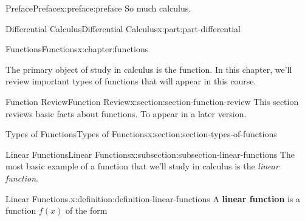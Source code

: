 \documentclass[twoside,10pt,]{book}
\newcommand{\terminology}[1]{\textbf{#1}}
\numberwithin{equation}{part}
\begin{document}
\typeout{************************************************}
%
\begin{preface}{Preface}{}{Preface}{}{}{x:preface:preface}
So much calculus.%
\end{preface}
\setcounter{tocdepth}{1}
\renewcommand*\contentsname{Contents}
\tableofcontents
\mainmatter
%
%
\typeout{************************************************}
\typeout{************************************************}
%
\begin{partptx}{Differential Calculus}{}{Differential Calculus}{}{}{x:part:part-differential}
%
\typeout{************************************************}
\typeout{************************************************}
%
\begin{chapterptx}{Functions}{}{Functions}{}{}{x:chapter:functions}
\begin{introduction}{}%
The primary object of study in calculus is the function. In this chapter, we'll review important types of functions that will appear in this course.%
\end{introduction}%
%
%
\typeout{************************************************}
\typeout{************************************************}
%
\begin{sectionptx}{Function Review}{}{Function Review}{}{}{x:section:section-function-review}
This section reviews basic facts about functions. To appear in a later version.%
\end{sectionptx}
%
%
\typeout{************************************************}
\typeout{************************************************}
%
\begin{sectionptx}{Types of Functions}{}{Types of Functions}{}{}{x:section:section-types-of-functions}
%
%
\typeout{************************************************}
\typeout{************************************************}
%
\begin{subsectionptx}{Linear Functions}{}{Linear Functions}{}{}{x:subsection:subsection-linear-functions}
The most basic example of a function that we'll study in calculus is the \emph{linear function}.%
\begin{definition}{Linear Functions.}{x:definition:definition-linear-functions}%
%
A \terminology{linear function} is a function \(f(x)\) of the form%

\end{definition}
\end{subsectionptx}
\end{sectionptx}
\end{chapterptx}
\end{partptx}
\end{document}
